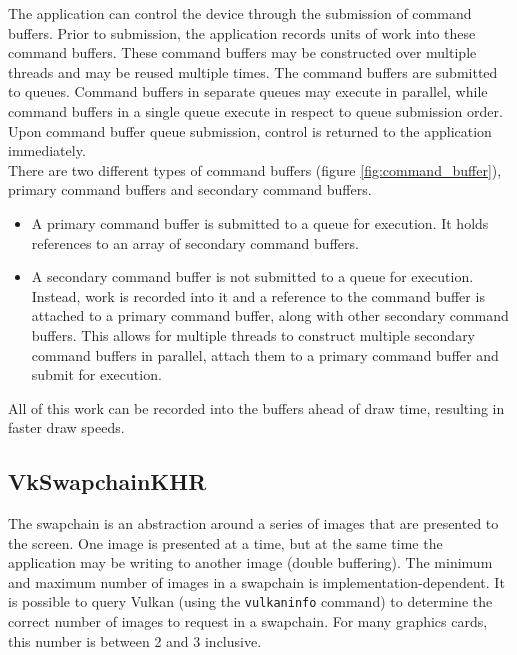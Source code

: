 \documentclass[12pt]{report}
\theoremstyle{definition}
\begin{document}
        The application can control the device through the submission of command
        buffers. Prior to submission, the application records units of work
        into these command buffers. These command buffers may be constructed
        over multiple threads and may be reused multiple times. The command
        buffers are submitted to queues. Command buffers in separate queues
        may execute in parallel, while command buffers in a single queue
        execute in respect to queue submission order. Upon command buffer
        queue submission, control is returned to the application immediately. \\

        There are two different types of command buffers (figure \ref{fig:command_buffer}),
        primary command buffers and secondary command buffers.

        \begin{itemize}
          \item A primary command buffer is submitted to a queue for execution.
          It holds references to an array of secondary command buffers.
          \item A secondary command buffer is not submitted to a queue for
          execution. Instead, work is recorded into it and a reference to the
          command buffer is attached to a primary command buffer, along with
          other secondary command buffers. This allows for multiple threads to
          construct multiple secondary command buffers in parallel, attach
          them to a primary command buffer and submit for execution.
        \end{itemize}

        All of this work can be recorded into the buffers ahead of draw time,
        resulting in faster draw speeds.

      \subsection{VkSwapchainKHR}

        The swapchain is an abstraction around a series of images that are presented
        to the screen. One image is presented at a time, but at the same time 
        the application may be writing to another image (double buffering). The
        minimum and maximum number of images in a swapchain is implementation-dependent.
        It is possible to query Vulkan (using the \texttt{vulkaninfo} command)
        to determine the correct number of images to request in a swapchain. For
        many graphics cards, this number is between 2 and 3 inclusive. \\
\end{document}
